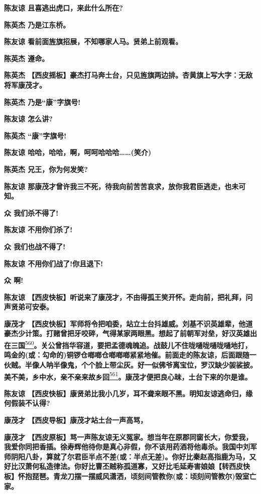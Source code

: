 \textbf{陈友谅 且喜逃出虎口，来此什么所在?}

\textbf{陈英杰 乃是江东桥。}

\textbf{陈友谅 看前面旌旗招展，不知哪家人马。贤弟上前观看。}

\textbf{陈英杰 遵命。}

\textbf{陈英杰
【西皮摇板】豪杰打马奔土台，只见旌旗两边排。杏黄旗上写大字：无敌将军康茂才。}

\textbf{陈英杰 乃是``康''字旗号!}

\textbf{陈友谅 怎么讲?}

\textbf{陈英杰 ``康''字旗号!}

\textbf{陈友谅 哈哈，哈哈，啊，呵呵哈哈哈\ldots{}\ldots{}(笑介)}

\textbf{陈英杰 兄王，你为何发笑?}

\textbf{陈友谅
那康茂才曾许我三不死，待我向前苦苦哀求，放你我君臣逃走，也未可知。}

\textbf{众 我们杀不得了!}

\textbf{陈友谅 不用你们杀了!}

\textbf{众 我们也战不得了!}

\textbf{陈友谅 不用你们战了!你且退下!}

\textbf{众 啊!}

\textbf{陈友谅
【西皮快板】听说来了康茂才，不由得孤王笑开怀。走向前，把礼拜，问声贤弟可安泰。}

\textbf{康茂才
【西皮快板】军师将令把咱委，站立土台抖雄威。刘基不识英雄辈，他道豪杰少计策。打赌曾把牙咬碎，气得某家两眼黑。想起了前朝军对垒，好汉英雄出在三国}\protect\hyperlink{fn560}{\textsuperscript{560}}\textbf{。关公曾挡华容道，要把孟德魂魄追。战鼓儿不住咙嗵咙嗵咙嗵地打，鸣金的(或：勾命的)铜锣仓啷啷仓啷啷啷紧紧地催。前面走的陈友谅，后面跟随一伙贼。半像人呐半像鬼，个个脸上带尘灰。好一似佛爷离宝位，罗汉缺少袈裟披。美不美，乡中水，亲不亲来故乡回}\protect\hyperlink{fn561}{\textsuperscript{561}}\textbf{。康茂才便把良心昧，土台下来的尔是谁。}

\textbf{陈友谅
【西皮快板】康贤弟比我小几岁，耳不聋来眼不黑。明知友谅逃命归，缘何假装不认得?}

\textbf{康茂才 【西皮导板】康茂才站土台一声高骂，}

\textbf{康茂才
【西皮原板】骂一声陈友谅无义冤家。想当年在原郡同窗长大，你爱我，我爱你同把香插。徐寿辉他待你是真心非假，你不该用药酒将他毒杀。我国中刘军师阴阳八卦，算就了尔君臣半点不差(或：半点无差)。你好比秦赵高指鹿为马，又好比汉萧何私造律法。你好比曹丕贼称孤道寡，又好比毛延寿害娘娘【转西皮快板】怀抱琵琶。青龙刀摆一摆威风潇洒，顷刻间管教你(或：顷刻间管教尔)毁室亡家。}

